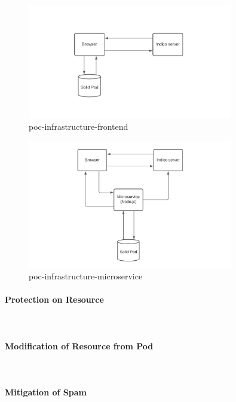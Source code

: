 \begin{figure}
    \centering
    \includegraphics[width=0.8\textwidth]{prototype/graphs/poc-infrastructure-frontend.jpeg}
    \caption{poc-infrastructure-frontend}
    \label{fig:poc-infrastructure-frontend}
\end{figure}

\begin{figure}
    \centering
    \includegraphics[width=0.8\textwidth]{prototype/graphs/poc-infrastructure-microservice.jpeg}
    \caption{poc-infrastructure-microservice}
    \label{fig:poc-infrastructure-microservice}
\end{figure}


\paragraph{Protection on Resource}\mbox{}\\

\paragraph{Modification of Resource from Pod}\mbox{}\\

\paragraph{Mitigation of Spam}\mbox{}\\


